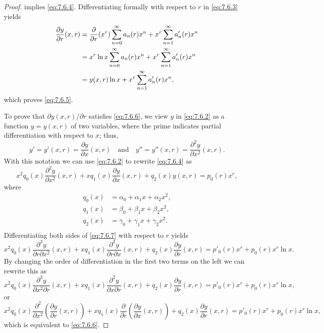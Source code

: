 \begin{proof}
 implies \eqref{eq:7.6.4}. Differentiating
formally
with respect to $r$ in \eqref{eq:7.6.3} yields
\begin{align*}
\frac{\partial y}{\partial r}(x,r)
&=\displaystyle{\frac{\partial}{\partial r}(x^r)\sum_{n=0}^\infty
a_n(r)x^n +x^r\sum_{n=1}^\infty  a_n'(r)x^n}\\
&=\displaystyle{x^r\ln x\sum_{n=0}^\infty
a_n(r)x^n +x^r\sum_{n=1}^\infty  a_n'(r)x^n}\\
&=y(x,r) \ln x +
x^r\sum_{n=1}^\infty  a_n'(r)x^n,
\end{align*}
which proves \eqref{eq:7.6.5}.

To prove that  $\partial y(x,r)/\partial r$ satisfies \eqref{eq:7.6.6}, we
view $y$ in \eqref{eq:7.6.2} as a function $y=y(x,r)$  of two
variables, where the prime indicates partial differentiation with
respect to $x$;   thus,
\[
y'=y'(x,r)=\frac{\partial y}{\partial x}(x,r)\quad\text{and}\quad 
y''=y''(x,r)=\frac{\partial^2 y}{\partial x^2}(x,r).
\]
With this notation we can use \eqref{eq:7.6.2} to rewrite \eqref{eq:7.6.4} as
\begin{equation} \label{eq:7.6.7}
x^2q_0(x)\frac{\partial^2 y}{\partial x^2}(x,r)+xq_1(x)\frac{\partial y}{\partial x}(x,r)+q_2(x)y(x,r)=p_0(r)x^r,
\end{equation}
where
\begin{align*}
q_0(x)&=\alpha_0+\alpha_1x+\alpha_2x^2,\\[5pt]
q_1(x)&=\beta_0+\beta_1x+\beta_2x^2,\\[5pt]
q_2(x)&=\gamma_0+\gamma_1x+\gamma_2x^2.\\[5pt]
\end{align*}
Differentiating both sides of \eqref{eq:7.6.7} with respect to $r$
yields
\[
x^2q_0(x)\frac{\partial^3y}{\partial r\partial x^2}(x,r)+
xq_1(x)\frac{\partial^2y}{\partial r\partial x}(x,r)+q_2(x)\frac{\partial
y}{\partial r}(x,r)=p'_0(r)x^r+p_0(r) x^r \ln x.
\]
By changing the order of differentiation in the first two terms on the left
we can rewrite this  as
\[
x^2q_0(x)\frac{\partial^3 y}{\partial x^2\partial r}(x,r)
+xq_1(x)\frac{\partial^2 y}{\partial x\partial r}(x,r)+q_2(x)\frac{\partial
y}{\partial r}(x,r)=p'_0(r)x^r+p_0(r) x^r \ln x,
\]
or
\[
x^2q_0(x)\frac{\partial^2}{\partial x^2}
\left(\frac{\partial y}{\partial r}(x,r)\right)
+xq_1(x)\frac{\partial}{\partial r}\left(\frac{\partial y}{\partial
x}(x,r)\right) +q_2(x)\frac{\partial y}{\partial r}(x,r)=
p'_0(r)x^r+p_0(r) x^r \ln x,
\]
which is equivalent to \eqref{eq:7.6.6}.
\end{proof}

